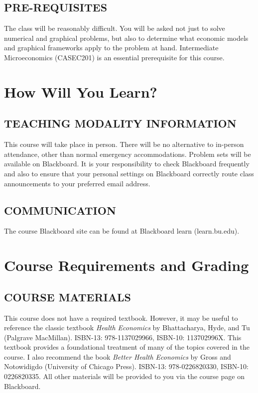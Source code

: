 \documentclass[12pt]{article}
\begin{document}
\subsection*{PRE-REQUISITES}

The class will be reasonably difficult.
You will be asked not just to solve numerical and graphical problems,
but also to determine what economic models and graphical frameworks apply to the problem at hand.
Intermediate Microeconomics (CASEC201) is an essential prerequisite for this course.

\section*{How Will You Learn?}

\subsection*{TEACHING MODALITY INFORMATION}

This course will take place in person.
There will be no alternative to in-person attendance, other than normal emergency accommodations.
Problem sets will be available on Blackboard.
It is your responsibility to check Blackboard frequently
and also to ensure that your personal settings on Blackboard correctly
route class announcements to your preferred email address.

\subsection*{COMMUNICATION}

The course Blackboard site can be found at Blackboard learn (learn.bu.edu).

\section*{Course Requirements and Grading}

\subsection*{COURSE MATERIALS}

This course does not have a required textbook.
However, it may be useful to reference the classic textbook
\emph{Health Economics} by Bhattacharya, Hyde, and Tu (Palgrave MacMillan).
ISBN-13: 978-1137029966, ISBN-10: 113702996X.
This textbook provides a foundational treatment of many of the topics covered in the course.
I also recommend the book 
\emph{Better Health Economics} by Gross and Notowidigdo (University of Chicago Press).
ISBN-13: 978-0226820330, ISBN-10: 0226820335.
All other materials will be provided to you via the course page on Blackboard.
\end{document}
